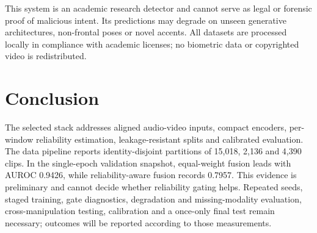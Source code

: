 \documentclass[conference]{IEEEtran}
\begin{document}
This system is an academic research detector and cannot serve as legal or forensic proof of malicious intent. Its predictions may degrade on unseen generative architectures, non-frontal poses or novel accents. All datasets are processed locally in compliance with academic licenses; no biometric data or copyrighted video is redistributed.

\section{Conclusion}
The selected stack addresses aligned audio-video inputs, compact encoders, per-window reliability estimation, leakage-resistant splits and calibrated evaluation. The data pipeline reports identity-disjoint partitions of 15,018, 2,136 and 4,390 clips. In the single-epoch validation snapshot, equal-weight fusion leads with AUROC 0.9426, while reliability-aware fusion records 0.7957. This evidence is preliminary and cannot decide whether reliability gating helps. Repeated seeds, staged training, gate diagnostics, degradation and missing-modality evaluation, cross-manipulation testing, calibration and a once-only final test remain necessary; outcomes will be reported according to those measurements.
\end{document}
